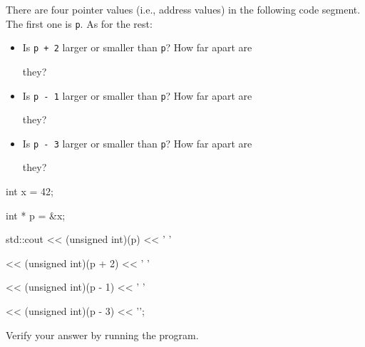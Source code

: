 There are four pointer values (i.e., address values) in the following code segment. The first one is \texttt{p}. As for the rest:



\begin{itemize}

\item Is \texttt{p + 2} larger or smaller than \texttt{p}? How far apart are

  they?

\item Is \texttt{p - 1} larger or smaller than \texttt{p}? How far apart are

  they?

\item Is \texttt{p - 3} larger or smaller than \texttt{p}? How far apart are

  they?

\end{itemize}



\begin{consolethree}[escapeinside=||]

int x = 42;

int * p = &x;

std::cout << (unsigned int)(p) << ' '

          << (unsigned int)(p + 2) << ' '

          << (unsigned int)(p - 1) << ' '

          << (unsigned int)(p - 3) << '\n';

\end{consolethree}



Verify your answer by running the program.

